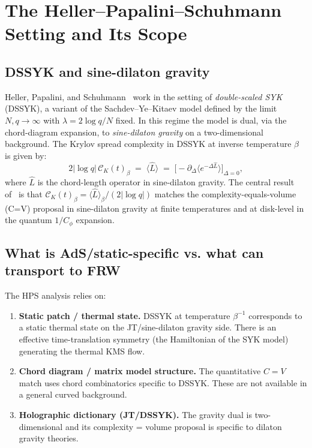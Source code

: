 \documentclass[12pt,a4paper]{article}
\theoremstyle{definition}
\newcommand{\CK}{\mathcal{C}_K}
\begin{document}
\section{The Heller--Papalini--Schuhmann Setting and Its Scope}
\label{sec:HPS}

\subsection{DSSYK and sine-dilaton gravity}

Heller, Papalini, and Schuhmann~\cite{HPS2024} work in the setting of
\emph{double-scaled SYK} (DSSYK), a variant of the Sachdev--Ye--Kitaev
model defined by the limit $N, q \to \infty$ with $\lambda = 2 \log q / N$
fixed.
In this regime the model is dual, via the chord-diagram expansion, to
\emph{sine-dilaton gravity} on a two-dimensional background.
The Krylov spread complexity in DSSYK at inverse temperature $\beta$
is given by:
\begin{equation}
  2|\log q|\,\CK(t)_\beta \;=\; \langle \hat{L} \rangle
  \;=\; \bigl[-\partial_\Delta \langle e^{-\Delta\hat{L}}\rangle\bigr]_{\Delta=0},
  \label{eq:HPS-main}
\end{equation}
where $\hat{L}$ is the chord-length operator in sine-dilaton gravity.
The central result of~\cite{HPS2024} is that
$\CK(t)_\beta = \langle \hat L \rangle_\beta / (2|\log q|)$
matches the complexity-equals-volume (C=V) proposal in sine-dilaton gravity
at finite temperatures and at disk-level in the quantum $1/C_\phi$ expansion.

\subsection{What is AdS/static-specific vs. what can transport to FRW}

The HPS analysis relies on:
\begin{enumerate}
\item \textbf{Static patch / thermal state.}
  DSSYK at temperature $\beta^{-1}$ corresponds to a static thermal
  state on the JT/sine-dilaton gravity side. There is an effective
  time-translation symmetry (the Hamiltonian of the SYK model)
  generating the thermal KMS flow.

\item \textbf{Chord diagram / matrix model structure.}
  The quantitative $C = V$ match uses chord combinatorics specific
  to DSSYK. These are not available in a general curved background.

\item \textbf{Holographic dictionary (JT/DSSYK).}
  The gravity dual is two-dimensional and its complexity = volume
  proposal is specific to dilaton gravity theories.
\end{enumerate}
\end{document}
